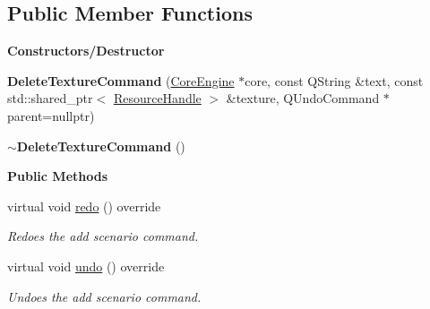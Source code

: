\subsection*{Public Member Functions}
\begin{Indent}\textbf{ Constructors/\+Destructor}\par
\begin{DoxyCompactItemize}
\item 
\mbox{\label{classrev_1_1_delete_texture_command_a6d43a2d318b22a3ef4dfe6e59d79c8f6}} 
{\bfseries Delete\+Texture\+Command} (\mbox{\hyperlink{classrev_1_1_core_engine}{Core\+Engine}} $\ast$core, const Q\+String \&text, const std\+::shared\+\_\+ptr$<$ \mbox{\hyperlink{classrev_1_1_resource_handle}{Resource\+Handle}} $>$ \&texture, Q\+Undo\+Command $\ast$parent=nullptr)
\item 
\mbox{\label{classrev_1_1_delete_texture_command_a2e082dfe0532cce397e4d7c65bd024dd}} 
{\bfseries $\sim$\+Delete\+Texture\+Command} ()
\end{DoxyCompactItemize}
\end{Indent}
\begin{Indent}\textbf{ Public Methods}\par
\begin{DoxyCompactItemize}
\item 
\mbox{\label{classrev_1_1_delete_texture_command_a76144674fb7514d2f4d932081c9f4c94}} 
virtual void \mbox{\hyperlink{classrev_1_1_delete_texture_command_a76144674fb7514d2f4d932081c9f4c94}{redo}} () override
\begin{DoxyCompactList}\small\item\em Redoes the add scenario command. \end{DoxyCompactList}\item 
\mbox{\label{classrev_1_1_delete_texture_command_a9015dd7267339eaa610cee0f6a233254}} 
virtual void \mbox{\hyperlink{classrev_1_1_delete_texture_command_a9015dd7267339eaa610cee0f6a233254}{undo}} () override
\begin{DoxyCompactList}\small\item\em Undoes the add scenario command. \end{DoxyCompactList}\end{DoxyCompactItemize}
\end{Indent}
